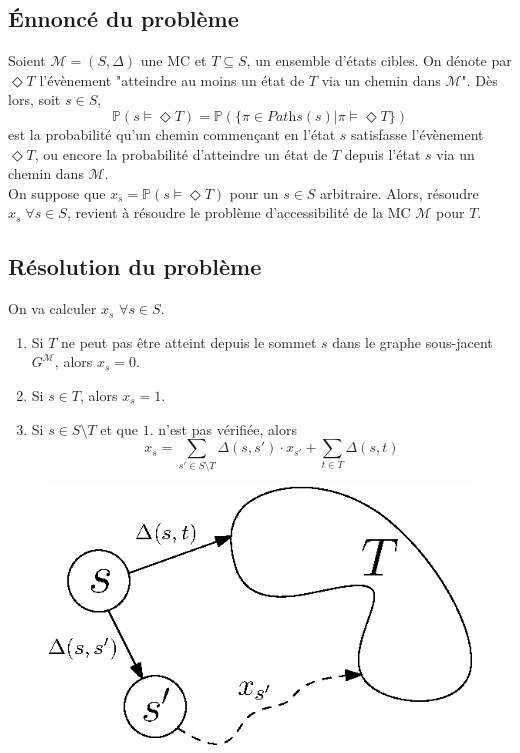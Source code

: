 \documentclass[12pt,a4paper]{report}
\theoremstyle{definition}%
\theoremstyle{remark}
\begin{document}
\subsection{\'Ennoncé du problème}
Soient $\mathcal{M} = (S, \Delta)$ une MC et $T \subseteq S$, un ensemble d'états cibles. On dénote par $\Diamond T$ l'évènement "atteindre au moins un état de $T$ via un chemin dans $\mathcal{M}$". Dès lors, soit $s \in S$, \[\mathbb{P}(s \models \Diamond T) = \mathbb{P}(\{\pi \in \textit{Paths}(s) | \pi \models \Diamond T\})\] est la probabilité qu'un chemin commençant en l'état $s$ satisfasse l'évènement $\Diamond T$, ou encore la probabilité d'atteindre un état de $T$ depuis l'état $s$ via un chemin dans $\mathcal{M}$.\\
On suppose que $x_s = \mathbb{P}(s \models \Diamond T)$ pour un $s \in S$ arbitraire. Alors, résoudre $x_s \; \forall s\in S$, revient à résoudre le problème d'accessibilité de la MC $\mathcal{M}$ pour $T$.
\subsection{Résolution du problème}
On va calculer $x_s$ $ \forall s \in S$.
\begin{enumerate}
	\item Si $T$ ne peut pas être atteint depuis le sommet $s$ dans le graphe sous-jacent $G^\mathcal{M}$, alors $x_s = 0$.
	\item Si $s \in T$, alors $x_s = 1$.
	\item Si $s \in S \setminus T$ et que $1.$ n'est pas vérifiée, alors 
		\[ x_s = \sum_{s' \in S \setminus T} \Delta(s, s') \cdot x_{s'} + \sum_{t \in T} \Delta(s, t) \]
\end{enumerate}

\begin{figure}[H]
	\centering
	\includegraphics[scale=0.6]{figures/reachability.eps}
	\label{reachablity}
\end{figure}
\end{document}
